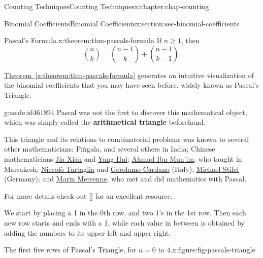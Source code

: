 \documentclass[oneside,10pt,]{book}
\newcommand{\xreffont}{\relax}
\newcommand{\terminology}[1]{\textbf{#1}}
\numberwithin{equation}{section}
\begin{document}
\begin{chapterptx}{Counting Techniques}{}{Counting Techniques}{}{}{x:chapter:chap-counting}
\begin{sectionptx}{Binomial Coefficients}{}{Binomial Coefficients}{}{}{x:section:sec-binomial-coefficients}
\begin{theorem}{Pascal's Formula.}{}{x:theorem:thm-pascals-formula}%
If \(n \geq 1\), then%
\begin{equation*}
\binom{n}{k} = \binom{n-1}{k} + \binom{n-1}{k-1}\text{.}
\end{equation*}
%
\end{theorem}
\hyperref[x:theorem:thm-pascals-formula]{Theorem~{\xreffont\ref{x:theorem:thm-pascals-formula}}} generates an intuitive visualization of the binomial coefficients that you may have seen before, widely known as Pascal's Triangle.%
\begin{aside}{}{g:aside:id461894}%
Pascal was not the first to discover this mathematical object, which was simply called the \terminology{arithmetical triangle} beforehand.%
\par
This triangle and its relations to combinatorial problems was known to several other mathematicians: Piṅgala, and several others in India; Chinese mathematicians \href{https://en.wikipedia.org/wiki/Jia_Xian}{Jia Xian} and \href{https://en.wikipedia.org/wiki/Yang_Hui}{Yang Hui}; \href{https://en.wikipedia.org/wiki/Ahmad_ibn_Munim_al-Abdari}{Ahmad Ibn Mun'im}, who taught in Marrakesh; \href{https://en.wikipedia.org/wiki/Niccol\%C3\%B2_Fontana_Tartaglia}{Niccolò Tartaglia} and \href{https://en.wikipedia.org/wiki/Gerolamo_Cardano}{Gerolamo Cardano} (Italy); \href{https://en.wikipedia.org/wiki/Michael_Stifel}{Michael Stifel} (Germany); and \href{https://en.wikipedia.org/wiki/Marin_Mersenne}{Marin Mersenne}, who met and did mathematics with Pascal.%
\par
For more details check out \hyperlink{x:biblio:bib-wilson-2013}{[{\xreffont 8}]} for an excellent resource.%
\end{aside}
We start by placing a 1 in the 0th row, and two 1's in the 1st row. Then each new row starts and ends with a 1, while each value in between is obtained by adding the numbers to its upper left and upper right.%
\begin{figureptx}{The first five rows of Pascal's Triangle, for \(n = 0\) to \(4\).}{x:figure:fig-pascals-triangle}{}%
\begin{image}{0.3}{0.4}{0.3}%
\end{image}
\end{figureptx}
\end{sectionptx}
\end{chapterptx}
\end{document}
